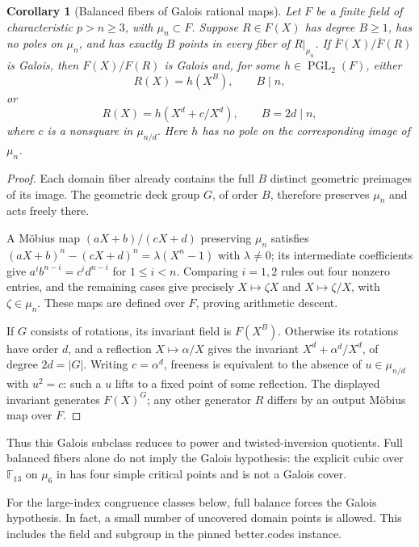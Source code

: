 \documentclass[11pt,letterpaper]{article}
\newtheorem{corollary}[theorem]{Corollary}
\theoremstyle{definition}
\theoremstyle{remark}
\begin{document}
\begin{corollary}[Balanced fibers of Galois rational maps]
\label{cor:galois-balanced-fibers}
Let $F$ be a finite field of characteristic $p>n\ge3$, with
$\mu_n\subset F$. Suppose $R\in F(X)$ has degree $B\ge1$, has no
poles on $\mu_n$, and has exactly $B$ points in every fiber of
$R|_{\mu_n}$. If $\overline F(X)/\overline F(R)$ is Galois, then
$F(X)/F(R)$ is Galois and, for some $h\in\operatorname{PGL}_2(F)$,
either
\[
 R(X)=h(X^B),\qquad B\mid n,
\]
or
\[
 R(X)=h(X^d+c/X^d),\qquad B=2d\mid n,
\]
where $c$ is a nonsquare in $\mu_{n/d}$. Here $h$ has no pole on
the corresponding image of $\mu_n$.
\end{corollary}
\begin{proof}
Each domain fiber already contains the full $B$ distinct geometric
preimages of its image. The geometric deck group $G$, of order $B$,
therefore preserves $\mu_n$ and acts freely there.

A M\"obius map $(aX+b)/(cX+d)$ preserving $\mu_n$ satisfies
$(aX+b)^n-(cX+d)^n=\lambda(X^n-1)$ with $\lambda\ne0$;
its intermediate coefficients give
$a^ib^{n-i}=c^id^{n-i}$ for $1\le i<n$.
Comparing $i=1,2$ rules out four nonzero entries, and the remaining
cases give precisely $X\mapsto\zeta X$ and $X\mapsto\zeta/X$,
with $\zeta\in\mu_n$.
These maps are defined over $F$, proving arithmetic descent.

If $G$ consists of rotations, its invariant field is $F(X^B)$.
Otherwise its rotations have order $d$, and a reflection
$X\mapsto\alpha/X$ gives the invariant
$X^d+\alpha^d/X^d$, of degree $2d=|G|$.
Writing $c=\alpha^d$, freeness is equivalent to the absence of
$u\in\mu_{n/d}$ with $u^2=c$: such a $u$ lifts to a fixed point
of some reflection. The displayed invariant generates $F(X)^G$;
any other generator $R$ differs by an output M\"obius map over $F$.
\end{proof}

Thus this Galois subclass reduces to power and twisted-inversion
quotients. Full balanced fibers alone do not imply the Galois
hypothesis: the explicit cubic over $\mathbb F_{13}$ on $\mu_6$
in  has four
simple critical points and is not a Galois cover.

For the large-index congruence classes below, full balance forces
the Galois hypothesis. In fact, a small number of uncovered domain
points is allowed. This includes the field and subgroup in the
pinned better.codes instance.
\end{document}
